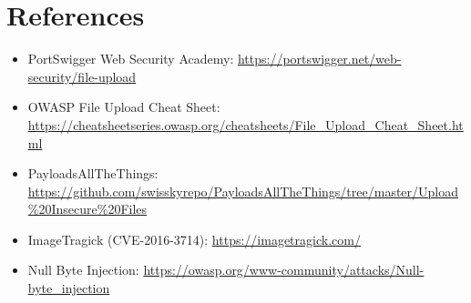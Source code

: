 \documentclass[11pt]{article}
\begin{document}
\section{References}

\begin{itemize}
    \item PortSwigger Web Security Academy: \url{https://portswigger.net/web-security/file-upload}
    \item OWASP File Upload Cheat Sheet: \url{https://cheatsheetseries.owasp.org/cheatsheets/File_Upload_Cheat_Sheet.html}
    \item PayloadsAllTheThings: \url{https://github.com/swisskyrepo/PayloadsAllTheThings/tree/master/Upload\%20Insecure\%20Files}
    \item ImageTragick (CVE-2016-3714): \url{https://imagetragick.com/}
    \item Null Byte Injection: \url{https://owasp.org/www-community/attacks/Null-byte_injection}
\end{itemize}
\end{document}
